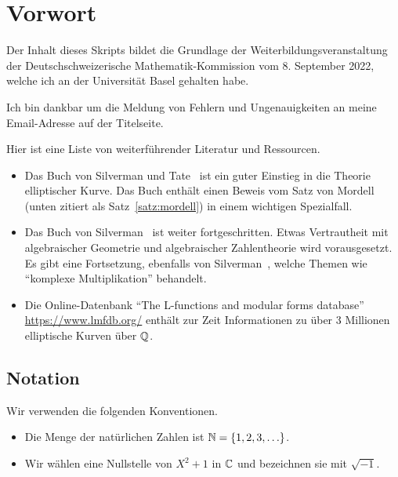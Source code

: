 \chapter{Vorwort}

Der Inhalt dieses Skripts bildet die Grundlage der
Weiterbildungsveranstaltung der Deutschschweizerische
Mathematik-Kommission vom 8. September 2022, welche ich an der
Universität Basel gehalten habe.

Ich bin dankbar um die Meldung von Fehlern und Ungenauigkeiten an
meine Email-Adresse auf der Titelseite.

Hier ist eine Liste von weiterführender Literatur und Ressourcen.
\begin{itemize}
\item Das Buch von Silverman und Tate~\cite{SilvermanTate}
  ist ein guter Einstieg in die Theorie
  elliptischer Kurve. Das Buch enthält einen Beweis vom Satz von Mordell (unten zitiert
  als Satz~\ref{satz:mordell}) in einem wichtigen Spezialfall.
\item Das Buch von Silverman~\cite{Silverman:AEC} ist weiter
  fortgeschritten. Etwas Vertrautheit mit  algebraischer Geometrie
  und  algebraischer Zahlentheorie wird vorausgesetzt. Es gibt eine
  Fortsetzung, ebenfalls von Silverman~\cite{Silverman:Adv}, welche
  Themen wie ``komplexe Multiplikation'' behandelt.
\item Die Online-Datenbank ``The L-functions and modular forms
  database'' \url{https://www.lmfdb.org/} enthält zur Zeit
  Informationen zu über 3
  Millionen elliptische Kurven über ${\mathbb{Q}}$.
\end{itemize}

\section{Notation}

Wir verwenden die folgenden Konventionen.

\begin{itemize}
\item Die Menge der natürlichen Zahlen ist ${\mathbb{N}} = \{1,2,3,\ldots\}$.

\item Wir wählen eine Nullstelle von $X^2+1$ in ${\mathbb{C}}$ und bezeichnen sie
  mit $\sqrt{-1}$.
  
\end{itemize}

